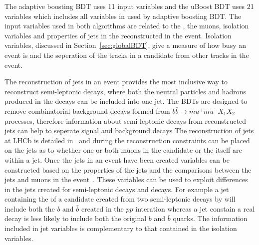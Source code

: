 The adaptive boosting BDT uses 11 input variables and the uBoost BDT uses 21 variables which includes all variables in used by adaptive boosting BDT.
The input variables used in both algorithms are related to the \bs, the muons, isolation variables and properties of jets in the reconstructed in the event. Isolation variables, discussed in Section~\ref{sec:globalBDT}, give a measure of how busy an event is and the seperation of the tracks in a \bsmumu candidate from other tracks in the event. 

The reconstruction of jets in an event provides the most inclusive way to reconstruct semi-leptonic decays, where both the neutral particles and hadrons produced in the decays can be included into one jet. 
The BDTs are designed to remove combinatorial background decays formed from $b\bar{b} \to mu^{+} mu^{-} X_{1} X_{2}$ processes, therefore information about semi-leptonic decays from reconstructed jets can help to seperate signal and background decays
The reconstruction of jets at LHCb is detailed in~\cite{} and during the reconstruction constraints can be placed on the jets as to whether one or both muons in the \bsmumu candidate or the \bs itself are within a jet. 
Once the jets in an event have been created variables can be constructed based on the properties of the jets and the comparisons between the jets and muons in the event~\cite{}. These variables can be used to exploit differences in the jets created for semi-leptonic decays and \bsmumu decays. For example a jet containing the \bs of a \bsmumu candidate created from two semi-leptonic decays by \bbbarmumux will include both the $b$ and $\bar{b}$ created in the $pp$ interation whereas a jet constain a real \bsmumu decay is less likely to include both the original $b$ and $\bar{b}$ quarks. The information included in jet variables is complementary to that contained in the isolation variables.



